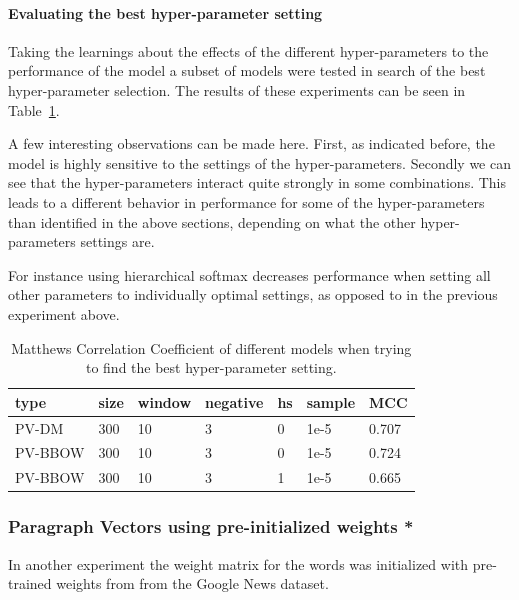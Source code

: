 \paragraph{Evaluating the best hyper-parameter setting}

Taking the learnings about the effects of the different hyper-parameters to the performance of the model a subset of models were tested in search of the best hyper-parameter selection. The results of these experiments can be seen in Table~\ref{tab:Paragraph Vector Parameter Results Best}.

A few interesting observations can be made here. First, as indicated before, the model is highly sensitive to the settings of the hyper-parameters. Secondly we can see that the hyper-parameters interact quite strongly in some combinations. This leads to a different behavior in performance for some of the hyper-parameters than identified in the above sections, depending on what the other hyper-parameters settings are.

For instance using hierarchical softmax decreases performance when setting all other parameters to individually optimal settings, as opposed to in the previous experiment above.

\begin{table}[h]
  \begin{center}
  \begin{tabular}{ *6l | l }
    \toprule
    type & size & window & negative & hs & sample & MCC  \\
    \midrule
    PV-DM & 300 & 10 & 3 & 0 & 1e-5 & 0.707 \\
    PV-BBOW & 300 & 10 & 3 & 0 & 1e-5 & 0.724 \\
    PV-BBOW & 300 & 10 & 3 & 1 & 1e-5 & 0.665 \\
    \bottomrule
  \end{tabular}
  \caption{Matthews Correlation Coefficient of different models when trying to find the best hyper-parameter setting.}
\label{tab:Paragraph Vector Parameter Results Best}
\end{center}
\end{table}

\subsubsection{Paragraph Vectors using pre-initialized weights *}

In another experiment the weight matrix for the words was initialized with pre-trained weights from from the Google News dataset.

